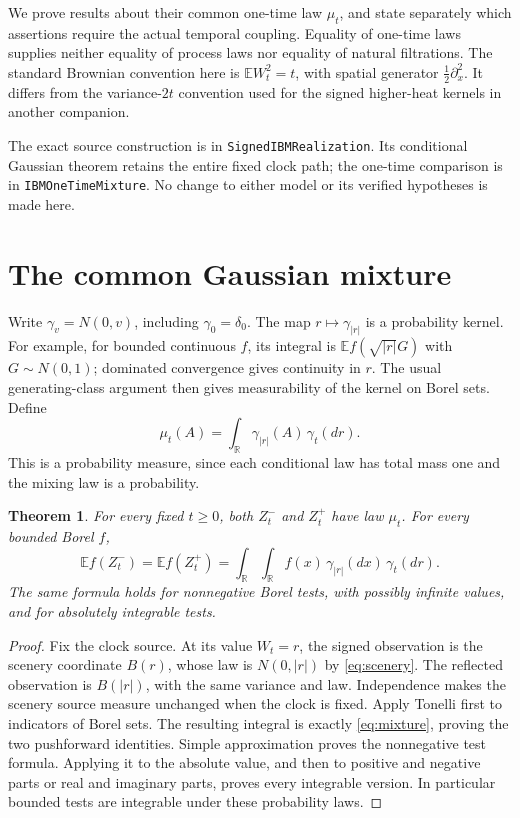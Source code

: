 \documentclass[11pt]{article}
\newtheorem{theorem}{Theorem}[section]
\newcommand{\R}{\mathbb R}
\newcommand{\E}{\mathbb E}
\newcommand{\code}[1]{{\small\nolinkurl{#1}}}
\begin{document}
We prove results about their common one-time law $\mu_t$, and state
separately which assertions require the actual temporal coupling.
Equality of one-time laws supplies neither equality of process laws
nor equality of natural filtrations. The standard Brownian convention
here is $\E W_t^2=t$, with spatial generator $\tfrac12\partial_x^2$.
It differs from the variance-$2t$ convention used for the signed
higher-heat kernels in another companion.

The exact source construction is in \code{SignedIBMRealization}.
Its conditional Gaussian theorem retains the entire fixed clock path;
the one-time comparison is in \code{IBMOneTimeMixture}.
No change to either model or its verified hypotheses is made here.

\section{The common Gaussian mixture}
Write $\gamma_v=N(0,v)$, including $\gamma_0=\delta_0$.
The map $r\mapsto\gamma_{|r|}$ is a probability kernel.
For example, for bounded continuous $f$, its integral is
$\E f(\sqrt{|r|}G)$ with $G\sim N(0,1)$; dominated convergence
gives continuity in $r$. The usual generating-class argument then
gives measurability of the kernel on Borel sets. Define
\begin{equation}\label{eq:mixture}
 \mu_t(A)=\int_\R\gamma_{|r|}(A)\,\gamma_t(dr).
\end{equation}
This is a probability measure, since each conditional law has total
mass one and the mixing law is a probability.

\begin{theorem}\label{thm:law}
For every fixed $t\geq0$, both $Z_t^-$ and $Z_t^+$ have law $\mu_t$.
For every bounded Borel $f$,
\begin{equation}\label{eq:expectation}
 \E f(Z_t^-)=\E f(Z_t^+)
 =\int_\R\int_\R f(x)\,\gamma_{|r|}(dx)\,\gamma_t(dr).
\end{equation}
The same formula holds for nonnegative Borel tests, with possibly
infinite values, and for absolutely integrable tests.
\end{theorem}
\begin{proof}
Fix the clock source. At its value $W_t=r$, the signed observation
is the scenery coordinate $B(r)$, whose law is $N(0,|r|)$ by
\eqref{eq:scenery}. The reflected observation is $B(|r|)$, with
the same variance and law. Independence makes the scenery source
measure unchanged when the clock is fixed. Apply Tonelli first to
indicators of Borel sets. The resulting integral is exactly
\eqref{eq:mixture}, proving the two pushforward identities. Simple
approximation proves the nonnegative test formula. Applying it to
the absolute value, and then to positive and negative parts or real
and imaginary parts, proves every integrable version. In particular
bounded tests are integrable under these probability laws.
\end{proof}
\end{document}
